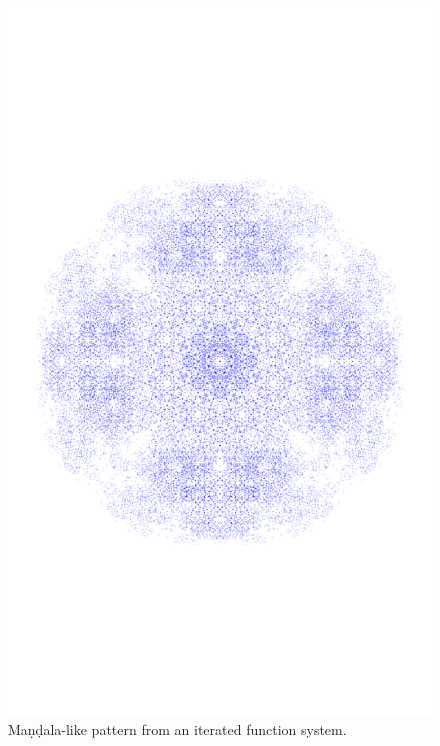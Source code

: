 \documentclass[../notebook.tex]{subfiles}
\begin{document}



\begin{figure}[ht]
  \centering
  \includegraphics{../python-notebooks/mandala.pdf}
  \caption{Ma\d{n}\d{d}ala-like pattern from an iterated function system.}\label{fig:mandala}
\end{figure}
\end{document}
